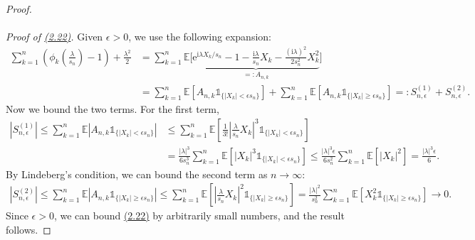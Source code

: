 \documentclass{article}
\numberwithin{equation}{section}
\newcommand{\e}{\mathrm{e}}
\newcommand{\E}{\mathbb{E}}
\renewcommand{\i}{\mathrm{i}}
\theoremstyle{plain}
\theoremstyle{definition}
\begin{document}
\begin{proof}
\paragraph{}\textit{Proof of \hyperref[eq:2.22]{(2.22)}.} Given $\epsilon>0$, we use the following expansion:
\begin{align*}
	\sum_{k=1}^n\left(\phi_k\left(\frac{\lambda}{s_n}\right)-1\right) + \frac{\lambda^2}{2} &= \sum_{k=1}^n\E\biggl[\underbrace{\e^{\i \lambda X_k/s_n} - 1 - \frac{\i\lambda}{s_n}X_k - \frac{(\i\lambda)^2}{2s_n^2}X_k^2}_{=:A_{n,k}}\biggr]\\
	&= \sum_{k=1}^n\E\left[A_{n,k}\mathds{1}_{\{\vert X_k\vert<\epsilon s_n\}}\right] + \sum_{k=1}^n\E\left[A_{n,k}\mathds{1}_{\{\vert X_k\vert\geq\epsilon s_n\}}\right] =: S_{n,\epsilon}^{(1)}+S_{n,\epsilon}^{(2)}.
\end{align*}
Now we bound the two terms. For the first term,
\begin{align*}
	\left\vert S_{n,\epsilon}^{(1)}\right\vert\leq \sum_{k=1}^n\E\left\vert A_{n,k}\mathds{1}_{\{\vert X_k\vert<\epsilon s_n\}}\right\vert &\leq \sum_{k=1}^n\E\left[ \frac{1}{3!}\left\vert\frac{\lambda}{s_n}X_k\right\vert^3\mathds{1}_{\{\vert X_k\vert<\epsilon s_n\}}\right]\\
	&= \frac{\vert\lambda\vert^3}{6s_n^3}\sum_{k=1}^n\E\left[\left\vert X_k\right\vert^3\mathds{1}_{\{\vert X_k\vert<\epsilon s_n\}}\right] \leq \frac{\vert\lambda\vert^3\epsilon}{6s_n^2}\sum_{k=1}^n\E\left[\vert X_k\vert^2\right] = \frac{\vert\lambda\vert^3\epsilon}{6}.\tag{2.25}\label{eq:2.25}
\end{align*}
By Lindeberg's condition, we can bound the second term as $n\to\infty$:
\begin{align*}
	\left\vert S_{n,\epsilon}^{(2)}\right\vert \leq \sum_{k=1}^n\E\left\vert A_{n,k}\mathds{1}_{\{\vert X_k\vert\geq\epsilon s_n\}}\right\vert\leq\sum_{k=1}^n\E\left[\left\vert\frac{\lambda}{s_n}X_k\right\vert^2\mathds{1}_{\{\vert X_k\vert\geq\epsilon s_n\}}\right]=\frac{\vert\lambda\vert^2}{s_n^2}\sum_{k=1}^n\E\left[ X_k^2\mathds{1}_{\{\vert X_k\vert\geq\epsilon s_n\}}\right]\to 0.\tag{2.26}\label{eq:2.26}
\end{align*}
Since $\epsilon>0$, we can bound \hyperref[eq:2.22]{(2.22)} by arbitrarily small numbers, and the result follows.
\end{proof}
\end{document}
